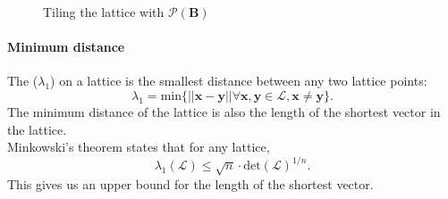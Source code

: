 \documentclass[a4paper, 11pt, openany]{book}
\begin{document}
\begin{figure}[ht]
\begin{minipage}{.5\textwidth}
{{}}
	\caption{Tiling the lattice with $\mathcal{P}(\textbf{B})$}
	\label{fg:tile}
\end{minipage}
\end{figure}

\paragraph{Minimum distance} The  ($\lambda_1$) on a lattice is the smallest distance between any two lattice points: $$\lambda_1 = \text{min}\{||\textbf{x} - \textbf{y}|| \forall \textbf{x},\textbf{y}\in\mathcal{L}, \textbf{x}\neq\textbf{y}\}.$$
The minimum distance of the lattice is also the length of the shortest vector in the lattice.
\\
Minkowski's theorem states that for any lattice,
\[
    \lambda_1(\mathcal{L}) \leq \sqrt{n}\cdot\text{det}(\mathcal{L})^{1/n}.
\]
This gives us an upper bound for the length of the shortest vector.
\end{document}

